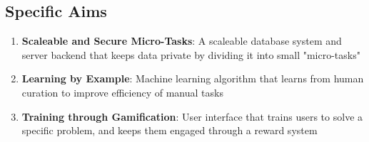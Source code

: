 \subsection*{Specific Aims}
\begin{enumerate}
\item \textbf{Scaleable and Secure Micro-Tasks}: A scaleable database system and server backend that keeps data private by dividing it into small "micro-tasks"
\item \textbf{Learning by Example}: Machine learning algorithm that learns from human curation to improve efficiency of manual tasks
\item \textbf{Training through Gamification}: User interface that trains users to solve a specific problem, and keeps them engaged through a reward system 
\end{enumerate}

